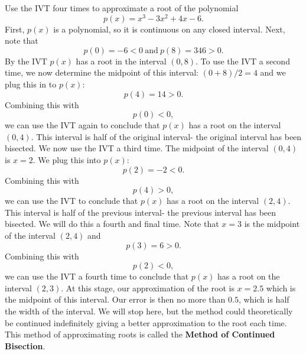 \documentclass[handout]{ximera}
\begin{document}
\begin{example}[example 5]
Use the IVT four times to approximate a root of the polynomial 
\[p(x) = x^3 - 3x^2 + 4x - 6.\]
First, $p(x)$ is a polynomial, so it is continuous on any closed interval.
Next, note that 
\[p(0) = -6 < 0 \ \text{and} \ p(8) = 346 > 0.\]
By the IVT $p(x)$ has a root in the interval $(0, 8)$. 
To use the IVT a second time, we now determine the midpoint of this interval: $(0+8)/2 = 4$ and we 
plug this in to $p(x)$:
\[p(4) =  14 > 0.\]
Combining this with
\[p(0) < 0,\]
we can use the IVT again to conclude that $p(x)$ has a root on the interval $(0, 4)$. 
This interval is half of the original interval- the original interval has been bisected. 
We now use the IVT a third time. The midpoint of the interval $(0, 4)$ is $x=2$. We plug this into $p(x)$:
\[p(2) =  -2 < 0.\]
Combining this with
\[p(4) > 0,\]
we can use the IVT to conclude that $p(x)$ has a root on the interval $(2,4)$. 
This interval is half of the previous interval- the previous interval has been bisected. 
We will do this a fourth and final time. Note that $x = 3$ is the midpoint of the interval $(2,4)$ and
\[p(3) = 6 > 0.\]
Combining this with
\[p(2) < 0,\]
we can use the IVT a fourth time to conclude that $p(x)$ has a root on the interval $(2, 3)$. 
At this stage, our approximation of the root is $x = 2.5$ which is the midpoint of this interval. 
Our error is then no more than $0.5$, which is half the width of the interval.
We will stop here, but the method could theoretically be continued indefinitely giving a better 
approximation to the root each time. This method of approximating roots is called the 
\textbf{Method of Continued Bisection}.
\end{example}




\begin{center}
\begin{foldable}
\end{foldable}
\end{center}
\end{document}
